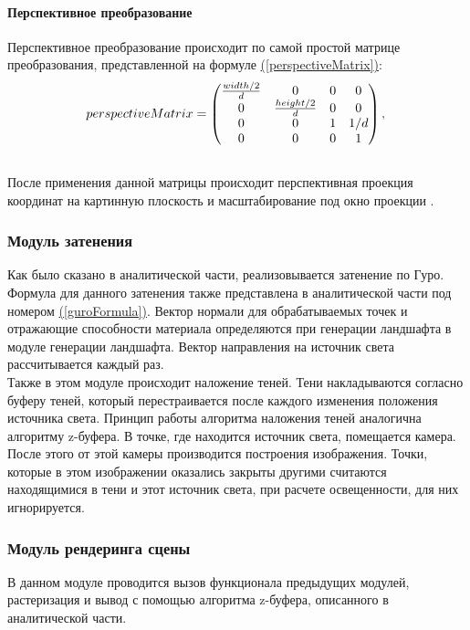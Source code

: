 \documentclass{article}
\begin{document}
	\paragraph{Перспективное преобразование}
	\indent Перспективное преобразование происходит по самой простой матрице преобразования, представленной на формуле \hyperref[perspectiveMatrix]{(\ref{perspectiveMatrix})}:
	\begin{equation}\label{perspectiveMatrix}
		perspectiveMatrix =
		\begin{pmatrix}
		\frac{width / 2}{d} & 0 & 0 & 0\\
		0 & \frac{height / 2}{d} & 0 & 0\\
		0 &0 & 1 & 1 / d\\
		0 & 0 & 0 & 1
		\end{pmatrix},\\
	\end{equation}
	\\ \indent После применения  данной матрицы происходит перспективная проекция координат на картинную плоскость и масштабирование под окно проекции \cite{perspectiveMatrix}.

	\subsubsection{Модуль затенения}
	\indent Как было сказано в аналитической части, реализовывается затенение по Гуро. Формула для данного затенения также представлена в аналитической части под номером \hyperref[guroFormula]{(\ref{guroFormula})}. Вектор нормали для обрабатываемых точек и отражающие способности материала определяются при генерации ландшафта в модуле генерации ландшафта. Вектор направления на источник света рассчитывается каждый раз.
	\\ \indent Также в этом модуле происходит наложение теней. Тени накладываются согласно буферу теней, который перестраивается после каждого изменения положения источника света. Принцип работы алгоритма наложения теней аналогична алгоритму z-буфера. В точке, где находится источник света, помещается камера. После этого от этой камеры производится построения изображения. Точки, которые в этом изображении оказались закрыты другими считаются находящимися в тени и этот источник света, при расчете освещенности, для них игнорируется.
	\subsubsection{Модуль рендеринга сцены}
	\indent  В данном модуле проводится вызов функционала предыдущих модулей, растеризация и вывод с помощью алгоритма z-буфера, описанного в аналитической части.
\end{document}
